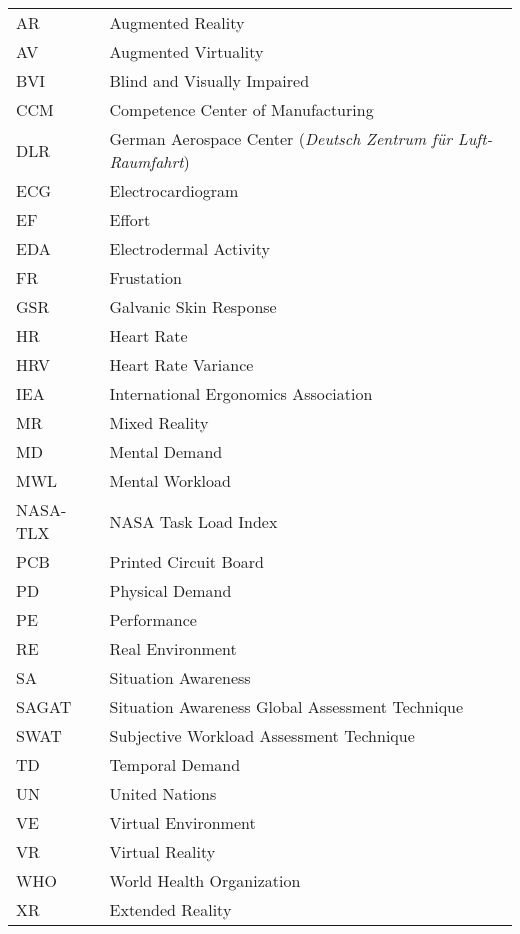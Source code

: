 
\begin{longtable}{ll}

AR & Augmented Reality \\
AV & Augmented Virtuality \\
BVI & Blind and Visually Impaired \\
CCM & Competence Center of Manufacturing \\
DLR & German Aerospace Center (\textit{Deutsch Zentrum für Luft- Raumfahrt}) \\
ECG & Electrocardiogram \\
EF & Effort \\
EDA & Electrodermal Activity \\
FR & Frustation \\
GSR & Galvanic Skin Response \\
HR & Heart Rate \\
HRV & Heart Rate Variance \\
IEA & International Ergonomics Association \\
MR & Mixed Reality \\
MD & Mental Demand \\
MWL & Mental Workload \\
NASA-TLX & NASA Task Load Index \\
PCB & Printed Circuit Board \\
PD & Physical Demand \\
PE & Performance \\
RE & Real Environment \\
SA & Situation Awareness \\
SAGAT & Situation Awareness Global Assessment Technique \\
SWAT & Subjective Workload Assessment Technique \\
TD & Temporal Demand \\
UN & United Nations \\
VE & Virtual Environment \\
VR & Virtual Reality \\
WHO & World Health Organization \\
XR & Extended Reality \\


\end{longtable}

